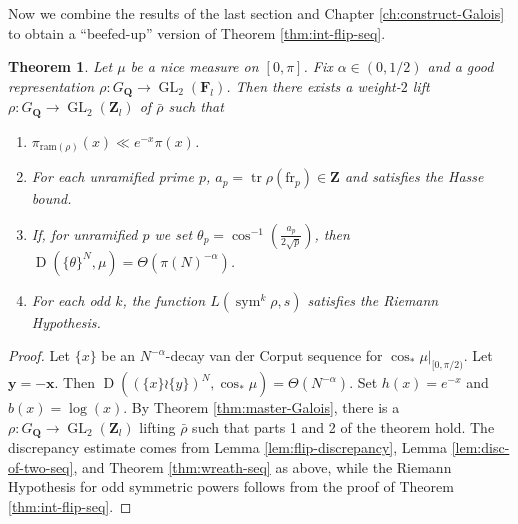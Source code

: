 \documentclass{article}
\DeclareMathOperator{\D}{D}
\DeclareMathOperator{\GL}{GL}
\DeclareMathOperator{\sym}{sym}
\DeclareMathOperator{\tr}{tr}
\newcommand{\bF}{\mathbf{F}}
\newcommand{\bQ}{\mathbf{Q}}
\newcommand{\bx}{{\boldsymbol x}}
\newcommand{\by}{{\boldsymbol y}}
\newcommand{\bZ}{\mathbf{Z}}
\newcommand{\frob}{\mathrm{fr}}
\newcommand{\ram}{\mathrm{ram}}
\newtheorem{theorem}{Theorem}
\begin{document}
Now we combine the results of the last section and Chapter 
\ref{ch:construct-Galois} to obtain a ``beefed-up'' version of Theorem 
\ref{thm:int-flip-seq}. 

\begin{theorem}\label{thm:bad-Galois}
Let $\mu$ be a nice measure on $[0,\pi]$. Fix $\alpha\in (0,1/2)$ and a good 
representation $\rho\colon G_\bQ \to \GL_2(\bF_l)$. Then there exists a 
weight-$2$ lift $\rho\colon G_\bQ \to \GL_2(\bZ_l)$ of $\bar\rho$ such that 
\begin{enumerate}
\item
$\pi_{\ram(\rho)}(x) \ll e^{-x}\pi(x)$. 

\item
For each unramified prime $p$, $a_p = \tr\rho(\frob_p)\in \bZ$ and satisfies 
the Hasse bound. 

\item
If, for unramified $p$ we set 
$\theta_p = \cos^{-1}\left(\frac{a_p}{2\sqrt p}\right)$, then 
$\D(\{\theta\}^N,\mu) = \Theta(\pi(N)^{-\alpha})$. 

\item
For each odd $k$, the function $L(\sym^k \rho,s)$ satisfies the Riemann 
Hypothesis. 
\end{enumerate}
\end{theorem}
\begin{proof}
Let $\{x\}$ be an $N^{-\alpha}$-decay van der Corput sequence for 
$\cos_\ast \left.\mu\right|_{[0,\pi/2)}$. Let $\by = -\bx$. Then 
$\D((\{x\}\wr\{y\})^N,\cos_\ast\mu) = \Theta(N^{-\alpha})$. Set $h(x) = e^{-x}$ 
and $b(x) = \log(x)$. By Theorem \ref{thm:master-Galois}, there is a 
$\rho\colon G_\bQ \to \GL_2(\bZ_l)$ lifting $\bar\rho$ such that parts 
1 and 2 of the theorem hold. The discrepancy estimate comes from Lemma 
\ref{lem:flip-discrepancy}, Lemma \ref{lem:disc-of-two-seq}, and Theorem 
\ref{thm:wreath-seq} as above, while the Riemann Hypothesis for odd symmetric 
powers follows from the proof of Theorem \ref{thm:int-flip-seq}. 
\end{proof}
\end{document}
